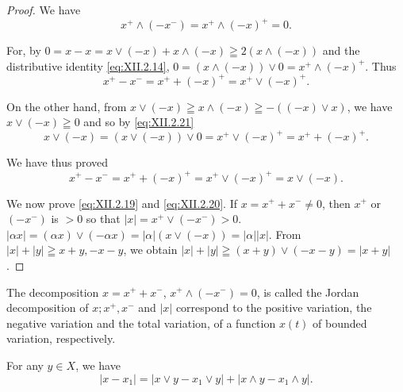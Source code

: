 \begin{proof}
 We have 
\begin{equation}\label{eq:XII.2.21}
x ^{+} \wedge (- x ^{-}) = x ^{+} \wedge (- x) ^{+} = 0. \end{equation}

For, by $0 = x - x = x \vee (-x) + x \wedge (-x) \geqq 2(x \wedge (-x))$ and the distributive identity \eqref{eq:XII.2.14}, $0 = (x \wedge (-x)) \vee 0 = x^{+} \wedge (-x)^{+}$. Thus 
\[
x ^{+} - x ^{-} = x ^{+} + (- x) ^{+} = x ^{+} \vee (- x) ^{+}.
\]

On the other hand, from $x \vee (-x) \geqq x \wedge (-x) \geqq -((-x) \vee x)$, we have $x \vee (-x) \geqq 0$ and so by \eqref{eq:XII.2.21} 
\[
x \vee (- x) = (x \vee (- x)) \vee 0 = x ^{+} \vee (- x) ^{+} = x ^{+} + (- x) ^{+}.
\]

We have thus proved 
\begin{equation}\label{eq:XII.2.22}
x ^{+} - x ^{-} = x ^{+} + (- x) ^{+} = x ^{+} \vee (- x) ^{+} = x \vee (- x).
\end{equation}

We now prove \eqref{eq:XII.2.19} and \eqref{eq:XII.2.20}. If $x = x^{+} + x^{-} \neq 0$, then $x^{+}$ or $(-x^{-})$ is $> 0$ so that $|x| = x^{+} \vee (-x^{-}) > 0$. $|\alpha x| = (\alpha x) \vee (-\alpha x) = |\alpha | (x \vee (-x)) = |\alpha | |x|$. From $|x| + |y| \geqq x + y, -x - y$, we obtain $|x| + |y| \geqq (x + y) \vee (-x - y) = |x + y|$. 
\end{proof}

\begin{remarku} The decomposition $x = x^{+} + x^{-}$, $x^{+} \wedge (-x^{-}) = 0$, is called the Jordan decomposition of $x; x^{+}, x^{-}$ and $|x|$ correspond to the positive variation, the negative variation and the total variation, of a function $x(t)$ of bounded variation, respectively. 
\end{remarku}

\begin{proposition}\label{prop:XII.2.Proposition.5} For any $y \in X$, we have 
\begin{equation}\label{eq:XII.2.23}
\left| x - x _{1} \right| = \left| x \vee y - x _{1} \vee y \right| + \left| x \wedge y - x _{1} \wedge y \right|.
\end{equation}
\end{proposition}


